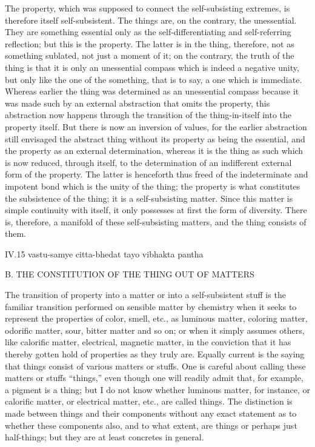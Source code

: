 The property, which was supposed to connect
the self-subsisting extremes,
is therefore itself self-subsistent.
The things are, on the contrary, the unessential.
They are something essential only as
the self-differentiating
and self-referring reflection;
but this is the property.
The latter is in the thing,
therefore, not as something sublated,
not just a moment of it;
on the contrary, the truth of the thing is
that it is only an unessential compass
which is indeed a negative unity,
but only like the one of the something,
that is to say, a one which is immediate.
Whereas earlier the thing was determined as
an unessential compass because it was made such
by an external abstraction that omits the property,
this abstraction now happens through the transition of
the thing-in-itself into the property itself.
But there is now an inversion of values,
for the earlier abstraction still envisaged
the abstract thing without its property
as being the essential,
and the property as an external determination,
whereas it is the thing as such which is now reduced,
through itself, to the determination of
an indifferent external form of the property.
The latter is henceforth thus freed of
the indeterminate and impotent bond
which is the unity of the thing;
the property is what constitutes
the subsistence of the thing;
it is a self-subsisting matter.
Since this matter is simple continuity with itself,
it only possesses at first the form of diversity.
There is, therefore, a manifold of
these self-subsisting matters,
and the thing consists of them.

IV.15
vastu-samye citta-bhedat tayo vibhakta pantha

B. THE CONSTITUTION OF THE THING OUT OF MATTERS

The transition of property into a matter
or into a self-subsistent stuff is the familiar
transition performed on sensible matter by chemistry
when it seeks to represent the properties of color, smell, etc.,
as luminous matter, coloring matter, odorific matter,
sour, bitter matter and so on;
or when it simply assumes others,
like calorific matter, electrical, magnetic matter,
in the conviction that it has thereby gotten hold
of properties as they truly are.
Equally current is the saying that
things consist of various matters or stuffs.
One is careful about calling these matters or stuffs “things,”
even though one will readily admit that,
for example, a pigment is a thing;
but I do not know whether luminous matter,
for instance, or calorific matter,
or electrical matter, etc., are called things.
The distinction is made between things and their components
without any exact statement as to whether these components also,
and to what extent, are things or perhaps just half-things;
but they are at least concretes in general.

